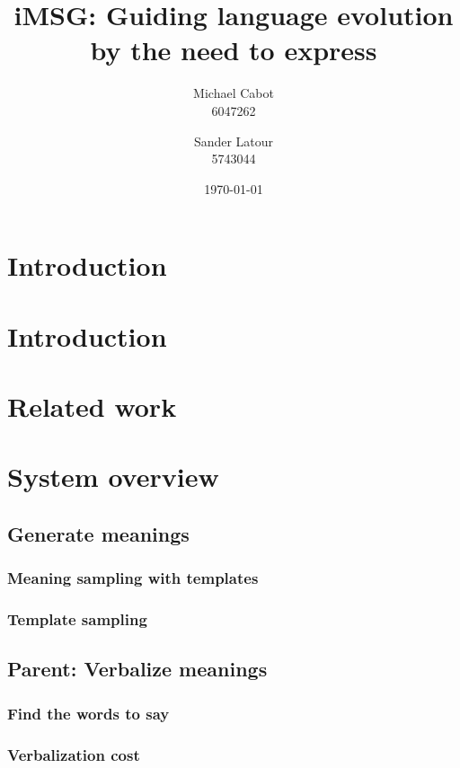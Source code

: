 \documentclass[a4paper]{article}
\title{iMSG: Guiding language evolution by the need to express}
\author{Michael Cabot\\6047262 \and Sander Latour\\5743044}
\begin{document}
\maketitle
\section{Introduction}

\date{\today}

\maketitle

\section{Introduction}
\cite{zuidema2003poverty} \cite{batali1999negotiation}
\section{Related work}
\section{System overview}
\subsection{Generate meanings}
\subsubsection{Meaning sampling with templates}
\subsubsection{Template sampling}
\subsection{Parent: Verbalize meanings}
\subsubsection{Find the words to say}
\subsubsection{Verbalization cost}
\end{document}
